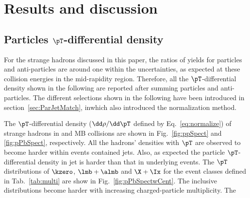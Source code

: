 
\section{Results and discussion}%
\label{sec:Results}

\subsection{Particles $\pT$-differential density}
\label{subsec:ParPtDensity}

For the strange hadrons discussed in this paper, the ratios of yields for particles and anti-particles are around one within the uncertainties, as expected at these collision energies in the mid-rapidity region.
Therefore, all the $\pT$-differential density shown in the following are reported after summing particles and anti-particles.
The different selections shown in the following have been introduced in section~\ref{sec:ParJetMatch}, inwhich also introduced the normalization method. 

The $\pT$-differential density ($\dd \rho/ \dd \pT$ defined by Eq.~\ref{eq:normalize}) of strange hadrons in \pp and MB \pPb collisions are shown in Fig.~\ref{fig:ppSpect} and \ref{fig:pPbSpect}, respectively.
All the hadrons' densities with $\pT$ are observed to become harder within events contained jets.
Also, as expected the particle $\pT$-differential density in jet is harder than that in underlying events.
The $\pT$ distributions of $\kzero$, $\lmb + \almb$ and $\X + \Ix$ for the event classes defined in Tab.~\ref{tab:multi} are show in Fig.~\ref{fig:pPbSpectwCent}. The inclusive distributions become harder with increasing charged-particle multiplicity. The 



